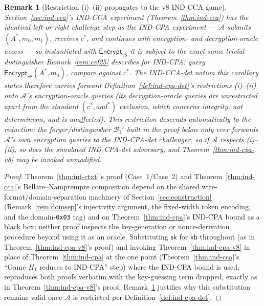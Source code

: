 \documentclass[11pt,a4paper]{article}
\newtheorem{remark}[theorem]{Remark}
\begin{document}
\begin{remark}[Restriction (i)--(ii) propagates to the v8 IND-CCA game]
\label{rem:cvf25-cca}
Section~\ref{sec:ind-cca}'s IND-CCA experiment (Theorem~\ref{thm:ind-cca})
has the identical left-or-right challenge step as the IND-CPA experiment
--- $\mathcal{A}$ submits $(A^*,m_0,m_1)$, receives $c^*$, and continues
with encryption- and decryption-oracle access --- so instantiated with
$\mathsf{Encrypt}_{v8}$ it is subject to the exact same trivial
distinguisher Remark~\ref{rem:cvf25} describes for IND-CPA: query
$\mathsf{Encrypt}_{v8}(A^*,m_0)$, compare against $c^*$. The
IND-CCA-det notion this corollary states therefore carries forward
Definition~\ref{def:ind-cpa-det}'s restrictions (i)--(ii) onto
$\mathcal{A}$'s \emph{encryption}-oracle queries (its decryption-oracle
queries are unrestricted apart from the standard
$(c^*,aad^*)$ exclusion, which concerns integrity, not determinism, and is
unaffected). This restriction descends automatically to the reduction: the
forger/distinguisher $\mathcal{B}_1'$ built in the proof below only ever
forwards $\mathcal{A}$'s own encryption queries to the IND-CPA-det
challenger, so if $\mathcal{A}$ respects (i)--(ii), so does the simulated
IND-CPA-det adversary, and Theorem~\ref{thm:ind-cpa-v8} may be invoked
unmodified.
\end{remark}

\begin{proof}
Theorem~\ref{thm:int-ctxt}'s proof (Case~1/Case~2) and
Theorem~\ref{thm:ind-cca}'s Bellare--Namprempre composition
\cite{bellare2000ae} depend on the shared wire-format/domain-separation
machinery of Section~\ref{sec:construction} (Remark~\ref{rem:domsep}'s
injectivity argument, the fixed-width token encoding, and the
domain-\texttt{0x03} tag) and on Theorem~\ref{thm:ind-cpa}'s IND-CPA bound
as a black box; neither proof inspects the key-generation or
nonce-derivation procedure beyond using it as an oracle. Substituting
$\mathsf{sk}$ for $\mathsf{kb}$ throughout (as in
Theorem~\ref{thm:ind-cpa-v8}'s proof) and invoking
Theorem~\ref{thm:ind-cpa-v8} in place of Theorem~\ref{thm:ind-cpa} at the
one point (Theorem~\ref{thm:ind-cca}'s ``Game $H_1$ reduces to IND-CPA''
step) where the IND-CPA bound is used, reproduces both proofs verbatim
with the key-guessing term dropped, exactly as in
Theorem~\ref{thm:ind-cpa-v8}'s proof; Remark~\ref{rem:cvf25-cca} justifies
why this substitution remains valid once $\mathcal{A}$ is restricted per
Definition~\ref{def:ind-cpa-det}.
\end{proof}
\end{document}

